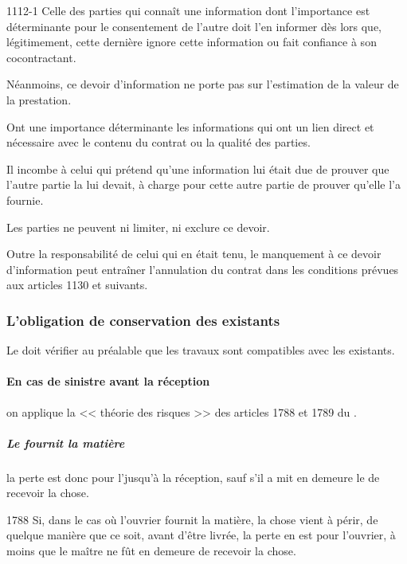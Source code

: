				\begin{citationArticleCciv}{1112-1}
					Celle des parties qui connaît une information dont l'importance est déterminante pour le consentement de l'autre doit l'en informer dès lors que, légitimement, cette dernière ignore cette information ou fait confiance à son cocontractant.
					
					Néanmoins, ce devoir d'information ne porte pas sur l'estimation de la valeur de la prestation.
					
					Ont une importance déterminante les informations qui ont un lien direct et nécessaire avec le contenu du contrat ou la qualité des parties.
					
					Il incombe à celui qui prétend qu'une information lui était due de prouver que l'autre partie la lui devait, à charge pour cette autre partie de prouver qu'elle l'a fournie.
					
					Les parties ne peuvent ni limiter, ni exclure ce devoir.
					
					Outre la responsabilité de celui qui en était tenu, le manquement à ce devoir d'information peut entraîner l'annulation du contrat dans les conditions prévues aux articles 1130 et suivants.
				\end{citationArticleCciv}
			
			
			\subsubsection{L'obligation de conservation des existants}
			
				Le \lo doit vérifier au préalable que les travaux sont compatibles avec les existants.
				
				\paragraph{En cas de sinistre avant la réception} on applique la << théorie des risques >> des articles 1788 et 1789 du \cciv.
				
				\subparagraph{Le \lo fournit la matière} la perte est donc pour l'\E jusqu'à la réception, sauf s'il a mit en demeure le \Mo de recevoir la chose.
				
				\begin{citationArticleCciv}{1788}
					Si, dans le cas où l'ouvrier fournit la matière, la chose vient à périr, de quelque manière que ce soit, avant d'être livrée, la perte en est pour l'ouvrier, à moins que le maître ne fût en demeure de recevoir la chose.
				\end{citationArticleCciv}
			
